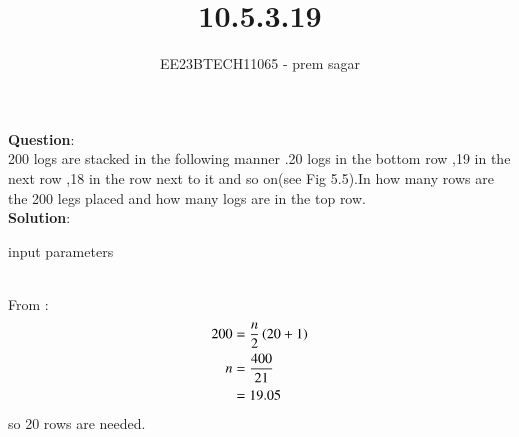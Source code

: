 \documentclass[journal,12pt,twocolumn]{IEEEtran}
\theoremstyle{remark}
\begin{document}

\vspace{3cm}

\title{10.5.3.19}
\author{EE23BTECH11065 - prem sagar}
\maketitle
\newpage

\bigskip 

\renewcommand{\thefigure}{\theenumi}
\renewcommand{\thetable}{\theenumi}
\textbf{Question}:\\ 200 logs are stacked in the following manner .20 logs in the bottom row ,19 in the next row ,18 in the row next to it and so on(see Fig 5.5).In how many rows are the 200 legs placed and how many logs are in the top row.
\\\textbf{Solution}:
\begin{table}[!ht]
  \centering
  \renewcommand\thetable{1}
  
  \caption{input parameters}
  \label{tab:10.5.3.19}
  \end{table}
  \\From {}:
\begin{align}
200&=\frac{n}{2}\left(20+1\right)
\\n&=\frac{400}{21}
  \\ &=19.05 
\end{align}
so 20 rows are needed.
\end{document}
